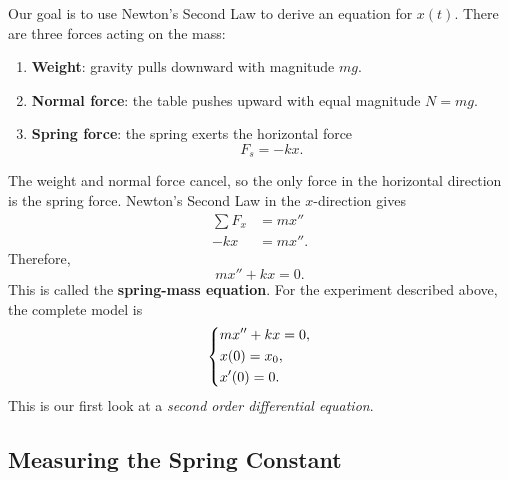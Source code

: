 \documentclass[11pt,letterpaper]{article}
\begin{document}
Our goal is to use Newton's Second Law to derive an equation for $x(t)$. There are three forces acting on the mass:
\begin{enumerate}
    \item \textbf{Weight}: gravity pulls downward with magnitude $mg$.
    \item \textbf{Normal force}: the table pushes upward with equal magnitude $N=mg$.
    \item \textbf{Spring force}: the spring exerts the horizontal force
    \[
    F_s=-kx.
    \]
\end{enumerate}

The weight and normal force cancel, so the only force in the horizontal direction is the spring force. Newton's Second Law in the $x$-direction gives
\begin{align*}
\sum F_x &= m x''\\
-kx &= m x''.
\end{align*}
Therefore,
\[
m x''+kx=0.
\]
This is called the \textbf{spring-mass equation}. For the experiment described above, the complete model is
\[
\begin{dcases}
m x''+kx=0,\\
x(0)=x_0,\\
x'(0)=0.
\end{dcases}
\]
This is our first look at a \textit{second order differential equation}.

\subsection{Measuring the Spring Constant}
\end{document}
